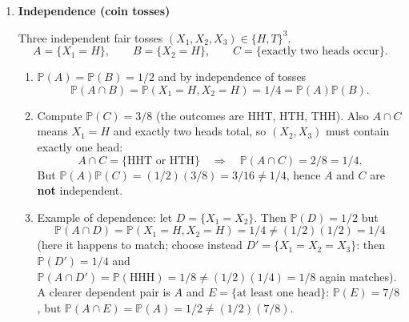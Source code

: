 \documentclass[11pt]{article}
\begin{document}
\begin{enumerate}
\begin{enumerate}[label=(\alph*)]
\item $\mathbb{P}(A)=\mathbb{P}(B)=\mathbb{P}(C)=2/4=1/2$.
Also $A\cap B=\{\omega_1\}$ so $\mathbb{P}(A\cap B)=1/4=(1/2)(1/2)$.
Similarly $A\cap C=\{\omega_2\}$ and $B\cap C=\{\omega_3\}$, each with probability $1/4$.
Hence $A,B,C$ are pairwise independent.

\item $A\cap B\cap C = \emptyset$ (no outcome is in all three sets), so
\[
\mathbb{P}(A\cap B\cap C)=0,
\qquad
\mathbb{P}(A)\mathbb{P}(B)\mathbb{P}(C)=(1/2)^3=1/8.
\]
Not equal, so they are not mutually independent.

\item Lesson: \textbf{pairwise independence does not imply mutual independence.}
\end{enumerate}

\bigskip

\item \textbf{Independence (coin tosses)}

Three independent fair tosses $(X_1,X_2,X_3)\in\{H,T\}^3$.
\[
A=\{X_1=H\},\qquad
B=\{X_2=H\},\qquad
C=\{\text{exactly two heads occur}\}.
\]

\begin{enumerate}[label=(\alph*)]
\item $\mathbb{P}(A)=\mathbb{P}(B)=1/2$ and by independence of tosses
\[
\mathbb{P}(A\cap B)=\mathbb{P}(X_1=H,X_2=H)=1/4=\mathbb{P}(A)\mathbb{P}(B).
\]

\item Compute $\mathbb{P}(C)=3/8$ (the outcomes are HHT, HTH, THH).
Also $A\cap C$ means $X_1=H$ and exactly two heads total, so $(X_2,X_3)$ must contain exactly one head:
\[
A\cap C=\{\text{HHT or HTH}\}\quad\Rightarrow\quad \mathbb{P}(A\cap C)=2/8=1/4.
\]
But $\mathbb{P}(A)\mathbb{P}(C)=(1/2)(3/8)=3/16\neq 1/4$, hence $A$ and $C$ are \textbf{not} independent.

\item Example of dependence: let $D=\{X_1=X_2\}$. Then $\mathbb{P}(D)=1/2$ but
\[
\mathbb{P}(A\cap D)=\mathbb{P}(X_1=H,X_2=H)=1/4\neq (1/2)(1/2)=1/4
\]
(here it happens to match; choose instead $D'=\{X_1=X_2=X_3\}$: then $\mathbb{P}(D')=1/4$ and
$\mathbb{P}(A\cap D')=\mathbb{P}(\text{HHH})=1/8\neq (1/2)(1/4)=1/8$ again matches).
A clearer dependent pair is $A$ and $E=\{\text{at least one head}\}$:
$\mathbb{P}(E)=7/8$, but $\mathbb{P}(A\cap E)=\mathbb{P}(A)=1/2\neq (1/2)(7/8)$.
\end{enumerate}


\end{enumerate}
\end{document}
